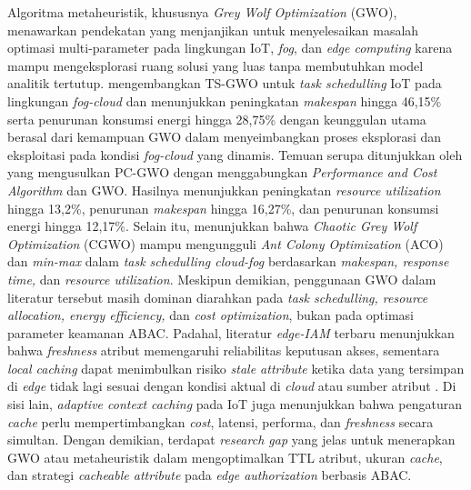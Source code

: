 Algoritma metaheuristik, khususnya \textit{Grey Wolf Optimization} (GWO), menawarkan pendekatan yang menjanjikan untuk menyelesaikan masalah optimasi multi-parameter pada lingkungan IoT, \textit{fog}, dan \textit{edge computing} karena mampu mengeksplorasi ruang solusi yang luas tanpa membutuhkan model analitik tertutup. \textcite{alsadie_modified_2025} mengembangkan TS-GWO untuk \textit{task schedulling} IoT pada lingkungan \textit{fog-cloud} dan menunjukkan peningkatan \textit{makespan} hingga 46,15\% serta penurunan konsumsi energi hingga 28,75\% dengan keunggulan utama berasal dari kemampuan GWO dalam menyeimbangkan proses eksplorasi dan eksploitasi pada kondisi \textit{fog-cloud} yang dinamis. Temuan serupa ditunjukkan oleh \textcite{alsamarai_improved_2024} yang mengusulkan PC-GWO dengan menggabungkan \textit{Performance and Cost Algorithm} dan GWO. Hasilnya menunjukkan peningkatan \textit{resource utilization} hingga 13,2\%, penurunan \textit{makespan} hingga 16,27\%, dan penurunan konsumsi energi hingga 12,17\%. Selain itu, \textcite{shreyas_chaotic_2025} menunjukkan bahwa \textit{Chaotic Grey Wolf Optimization} (CGWO) mampu mengungguli \textit{Ant Colony Optimization} (ACO) dan \textit{min-max} dalam \textit{task schedulling cloud-fog} berdasarkan \textit{makespan, response time,} dan \textit{resource utilization}. Meskipun demikian, penggunaan GWO dalam literatur tersebut masih dominan diarahkan pada \textit{task schedulling, resource allocation, energy efficiency,} dan \textit{cost optimization}, bukan pada optimasi parameter keamanan ABAC. Padahal, literatur \textit{edge-IAM} terbaru menunjukkan bahwa \textit{freshness} atribut memengaruhi reliabilitas keputusan akses, sementara \textit{local caching} dapat menimbulkan risiko \textit{stale attribute} ketika data yang tersimpan di \textit{edge} tidak lagi sesuai dengan kondisi aktual di \textit{cloud} atau sumber atribut \parencite{wang_edge-enabled_2025}. Di sisi lain, \textit{adaptive context caching} pada IoT juga menunjukkan bahwa pengaturan \textit{cache} perlu mempertimbangkan \textit{cost}, latensi, performa, dan \textit{freshness} secara simultan. Dengan demikian, terdapat \textit{research gap} yang jelas untuk menerapkan GWO atau metaheuristik dalam mengoptimalkan TTL atribut, ukuran \textit{cache}, dan strategi \textit{cacheable attribute} pada \textit{edge authorization} berbasis ABAC.

